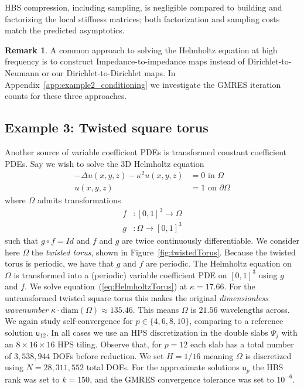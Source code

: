 \documentclass[final,onefignum,onetabnum]{siamart250211}
\newcommand{\vct}[1]{\bm{\mathsf{#1}}}
\theoremstyle{definition}
\newtheorem{remark}{Remark}
\begin{document}
HBS compression, including sampling, is negligible compared to building and factorizing the local stiffness matrices; both factorization and sampling costs match the predicted asymptotics.
\begin{remark}
    A common approach to solving the Helmholtz equation at high frequency is to construct Impedance-to-impedance maps instead of Dirichlet-to-Neumann or our Dirichlet-to-Dirichlet maps. In Appendix~\ref{app:example2_conditioning} we investigate the GMRES iteration counts for these three approaches.
\end{remark}

\subsection{Example 3: Twisted square torus}\label{subsec:twisted}
Another source of variable coefficient PDEs is transformed constant coefficient PDEs. Say we wish to solve the 3D Helmholtz equation
\begin{align}\label{eq:HelmholtzTorus}
    -\Delta u(x,y,z) - \kappa^2 u(x,y,z) &= 0\text{ in }\Omega\\
    u(x,y,z) &= 1\text{ on }\partial\Omega
\end{align}
where $\Omega$ admits transformations
\begin{align*}
    f&:[0,1]^3\rightarrow\Omega\\
    g&:\Omega\rightarrow[0,1]^3
\end{align*}
such that $g \circ f=\mathit{Id}$ and $f$ and $g$ are twice continuously differentiable. We consider here $\Omega$ the \textit{twisted torus}, shown in Figure~\ref{fig:twistedTorus}. Because the twisted torus is periodic, we have that $g$ and $f$ are periodic. The Helmholtz equation on $\Omega$ is transformed into a (periodic) variable coefficient PDE on $[0,1]^3$ using $g$ and $f$. We solve equation~(\ref{eq:HelmholtzTorus}) at $\kappa = 17.66$. For the untransformed twisted square torus this makes the original \textit{dimensionless wavenumber} $\kappa\cdot\text{diam}(\Omega)\approx135.46$. This means $\Omega$ is $21.56$ wavelengths across.
We again study self-convergence for $p\in\{4,6,8,10\}$, comparing to a reference solution $\vct{u}_{12}$. In all cases we use an HPS discretization in the double slabs $\Psi_j$ with an $8\times16\times16$ HPS tiling. Observe that, for $p=12$ each slab has a total number of $3,538,944$ DOFs before reduction. We set $H=1/16$ meaning $\Omega$ is discretized using $N=28,311,552$ total DOFs. For the approximate solutions $\vct{u}_{p}$ the HBS rank was set to $k=150$, and the GMRES convergence tolerance was set to $10^{-6}$. 
\end{document}
